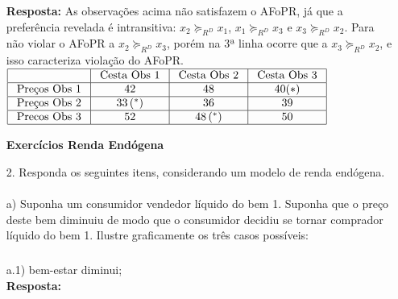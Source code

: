\begin{enumerate}
\textbf{Resposta:}
As observações acima não satisfazem o AFoPR, já que a preferência revelada é intransitiva:
{$x_2 \succeq _{R^{D}} x_1$}, {$x_1 \succeq _{R^{D}} x_3$} e {$x_3 \succeq _{R^{D}} x_2$}. Para não violar o AFoPR a {$x_2 \succeq _{R^{D}} x_3$}, porém na 3ª linha ocorre que a  
{$x_3 \succeq _{R^{D}} x_2$}, e isso caracteriza violação do AFoPR.\\

{$\begin{array}{|l|c|c|c|}
\hline & \text { Cesta Obs 1 } & \text { Cesta Obs 2 } & \text { Cesta Obs 3 } \\
\hline \text { Preços Obs 1 } & 42 & 48 & 40(*) \\
\hline \text { Preços Obs 2 } & 33\left(^{*}\right) & 36 & 39 \\
\hline \text { Precos Obs 3 } & 52 & 48\left(^{*}\right) & 50 \\
\hline
\end{array}$}

\newpage

\begin{center}
\textbf{Exercícios Renda Endógena}\\
\end{center}

\item[2.] Responda os seguintes itens, considerando um modelo de renda endógena.

\paragraph{} a) Suponha um consumidor vendedor líquido do bem 1. Suponha que o preço deste bem diminuiu de modo que o consumidor decidiu se tornar comprador líquido do bem 1. Ilustre graficamente os três casos possíveis:\\

\subparagraph{} a.1) bem-estar diminui;\\

\textbf{Resposta:}\\


\end{enumerate}
